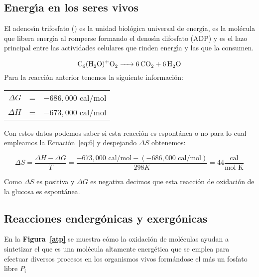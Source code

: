 \subsection{Energ\'{\i}a en los seres vivos}

El adenos\'{\i}n trifosfato ()  es la unidad biol\'ogica universal de energ\'{\i}a, es la mol\'ecula que libera energ\'{\i}a  al romperse formando el denos\'{\i}n difosfato (ADP)  y es el lazo principal entre las actividades celulares que rinden energ\'{\i}a y las que la consumen.

\begin{equation}
\ce{C6(H2O)+ O2 ->  6CO2 + 6H2O }
\end{equation}
Para la reacci\'on anterior tenemos la siguiente informaci\'on:

\begin{tabular}{rcl}
$\Delta G$ & = & $-686,000 $ cal/mol \\
$\Delta H$ & = & $-673,000 $ cal/mol \\
\end{tabular}

Con estos datos podemos saber si esta reacci\'on es espont\'anea o no para lo cual empleamos
la Ecuaci\'on~\ref{eq:6} y despejando $\Delta S$ obtenemos:

$$\Delta S = \frac{\Delta H-\Delta G}{T} =\frac{-673,000 \textrm{ cal/mol}-( -686,000 \textrm{ cal/mol})}{298
K}= 44 \frac{\mathrm{cal}}{\textrm{mol K}}$$

Como $\Delta S$ es positiva y $\Delta G$ es negativa decimos que esta reacci\'on de
oxidaci\'on de la glucosa es espont\'anea.

\subsection{Reacciones enderg\'onicas y exerg\'onicas}
En la \textbf{Figura~\ref{atp}} se muestra c\'omo la oxidaci\'on de mol\'eculas ayudan a sintetizar el
 que es una mol\'ecula altamente energ\'etica que se emplea para efectuar
diversos procesos en los organismos vivos form\'andose el  m\'as un
fosfato libre $P_i$

